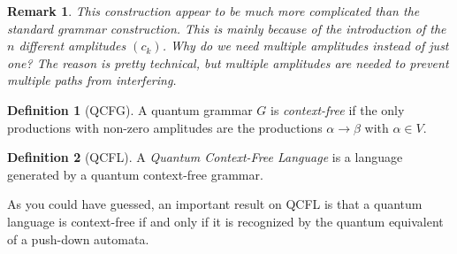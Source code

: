 \documentclass[12pt,a4paper]{article}
\theoremstyle{plain}
\newtheorem*{remark}{Remark}
\theoremstyle{definition}
\newtheorem*{definition}{Definition}
\begin{document}
\begin{remark}
    This construction appear to be much more complicated than the standard grammar construction. This is mainly because of the introduction of the $n$ different amplitudes $(c_k)$. Why do we need multiple amplitudes instead of just one? The reason is pretty technical, but multiple amplitudes are needed to prevent multiple paths from interfering.
\end{remark}

\begin{definition}[QCFG]
    A quantum grammar $G$ is \emph{context-free} if the only productions with non-zero amplitudes are the productions $\alpha\to\beta$ with $\alpha\in V$.
\end{definition}

\begin{definition}[QCFL]
    A \emph{Quantum Context-Free Language} is a language generated by a quantum context-free grammar.
\end{definition}

As you could have guessed, an important result on QCFL is that a quantum language is context-free if and only if it is recognized by the quantum equivalent of a push-down automata.
\end{document}
